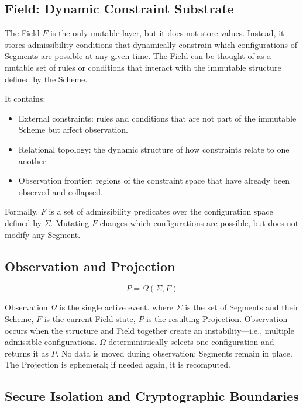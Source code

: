 \documentclass[
  a4paper,
  DIV=11,
  numbers=noendperiod]{scrartcl}
\providecommand{\tightlist}{%
  \setlength{\itemsep}{0pt}\setlength{\parskip}{0pt}}
\begin{document}
\subsection{Field: Dynamic Constraint
Substrate}\label{field-dynamic-constraint-substrate}

The Field \(F\) is the only mutable layer, but it does not store values.
Instead, it stores admissibility conditions that dynamically constrain
which configurations of Segments are possible at any given time. The
Field can be thought of as a mutable set of rules or conditions that
interact with the immutable structure defined by the Scheme.

It contains:

\begin{itemize}
\tightlist
\item
  External constraints: rules and conditions that are not part of the
  immutable Scheme but affect observation.
\item
  Relational topology: the dynamic structure of how constraints relate
  to one another.
\item
  Observation frontier: regions of the constraint space that have
  already been observed and collapsed.
\end{itemize}

Formally, \(F\) is a set of admissibility predicates over the
configuration space defined by \(\Sigma\). Mutating \(F\) changes which
configurations are possible, but does not modify any Segment.

\subsection{Observation and
Projection}\label{observation-and-projection}

\[ P = \Omega(\Sigma, F) \]

Observation \(\Omega\) is the single active event. where \(\Sigma\) is
the set of Segments and their Scheme, \(F\) is the current Field state,
\(P\) is the resulting Projection. Observation occurs when the structure
and Field together create an instability---i.e., multiple admissible
configurations. \(\Omega\) deterministically selects one configuration
and returns it as \(P\). No data is moved during observation; Segments
remain in place. The Projection is ephemeral; if needed again, it is
recomputed.

\subsection{Secure Isolation and Cryptographic
Boundaries}\label{secure-isolation-and-cryptographic-boundaries}
\end{document}
